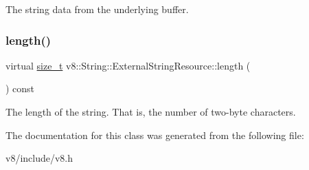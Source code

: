 The string data from the underlying buffer. \mbox{\label{classv8_1_1String_1_1ExternalStringResource_ab5ca300fea077d7c7774ec49d32e4da1}} 
\subsubsection{\texorpdfstring{length()}{length()}}
{\footnotesize\ttfamily virtual \mbox{\hyperlink{classsize__t}{size\+\_\+t}} v8\+::\+String\+::\+External\+String\+Resource\+::length (\begin{DoxyParamCaption}{ }\end{DoxyParamCaption}) const\hspace{0.3cm}{\ttfamily [pure virtual]}}

The length of the string. That is, the number of two-\/byte characters. 

The documentation for this class was generated from the following file\+:\begin{DoxyCompactItemize}
\item 
v8/include/v8.\+h\end{DoxyCompactItemize}

